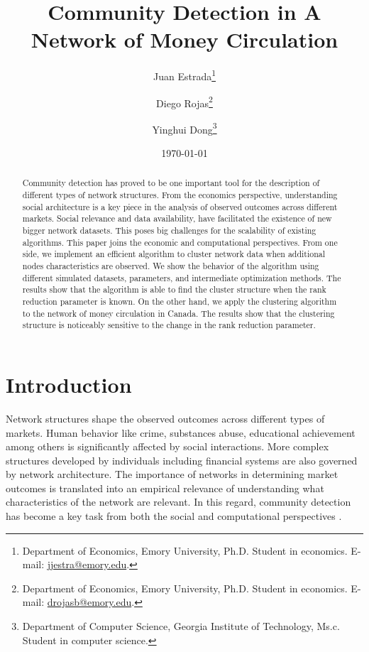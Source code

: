 \documentclass[11pt,letter]{article}%
\numberwithin{equation}{section}
\begin{document}
\title{\textbf{Community Detection in A Network of Money Circulation}}
\author{Juan Estrada\thanks{Department of Economics, Emory University, Ph.D. Student in economics. E-mail: \href{mailto:juan.jose.estrada.sosa@emory.edu}{jjestra@emory.edu}.}\and Diego Rojas\thanks{Department of Economics, Emory University, Ph.D. Student in economics. E-mail: \href{diego.israel.rojas.baez@emory.edu}{drojasb@emory.edu}.}\and Yinghui Dong\thanks{Department of Computer Science, Georgia Institute of Technology, Ms.c. Student in computer science.}}
\date{\today}

\maketitle 


\begin{abstract}
	\noindent Community detection has proved to be one important tool for the description of different types of network structures. From the economics perspective, understanding social architecture is a key piece in the analysis of observed outcomes across different markets. Social relevance and data availability, have facilitated the existence of new bigger network datasets. This poses big challenges for the scalability of existing algorithms. This paper joins the economic and computational perspectives. From one side, we implement an efficient algorithm to cluster network data when additional nodes characteristics are observed. We show the behavior of the algorithm using different simulated datasets, parameters, and intermediate optimization methods. The results show that the algorithm is able to find the cluster structure when the rank reduction parameter is known. On the other hand, we apply the clustering algorithm to the network of money circulation in Canada. The results show that the clustering structure is noticeably sensitive to the change in the rank reduction parameter.
\end{abstract}

\section{Introduction}

Network structures shape the observed outcomes across different types of markets. Human behavior like crime, substances abuse, educational achievement among others is significantly affected by social interactions. More complex structures developed by individuals including financial systems are also governed by network architecture. The importance of networks in determining market outcomes is translated into an empirical relevance of understanding what characteristics of the network are relevant. In this regard, community detection has become a key task from both the social and computational perspectives \citep{Jackson2019,Du2017}. 
\end{document}
